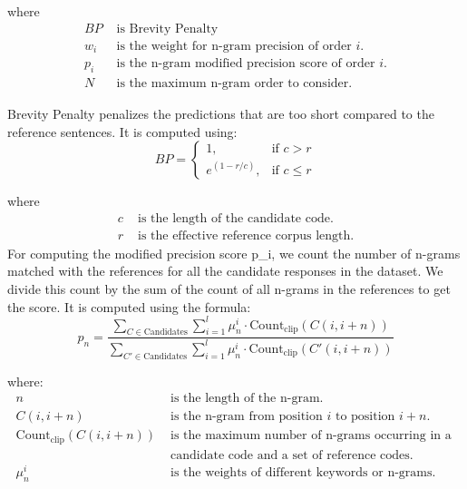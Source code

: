where
\begin{align*}
BP &\text{ is Brevity Penalty} \\
w_i &\text{ is the weight for n-gram precision of order } i. \\
p_i &\text{ is the n-gram modified precision score of order } i. \\
N &\text{ is the maximum n-gram order to consider.}
\end{align*}

Brevity Penalty penalizes the predictions that are too short compared to the reference sentences. It is computed using:
\begin{equation}
BP = 
\begin{cases}
1, & \text{if } c > r \\
e^{(1 - r/c)}, & \text{if } c \leq r
\end{cases}
\end{equation}

where
\begin{align*}
c &\text{ is the length of the candidate code.} \\
r &\text{ is the effective reference corpus length.}
\end{align*}
For computing the modified precision score p\_i, we count the number of n-grams matched with the references for all the candidate responses in the dataset. We divide this count by the sum of the count of all n-grams in the references to get the score. It is computed using the formula:
\begin{equation}
p_n = \frac{\sum_{C \in \text{Candidates}} \sum_{i=1}^{l} \mu_n^i \cdot \text{Count}_{\text{clip}} (C(i,i+n))}{\sum_{C' \in \text{Candidates}} \sum_{i=1}^{l} \mu_n^i \cdot \text{Count}_{\text{clip}} (C'(i,i+n))}
\end{equation}

where:
\begin{align*}
n &\text{ is the length of the n-gram.} \\
C(i, i+n) &\text{ is the n-gram from position } i \text{ to position } i+n. \\
\text{Count}_{\text{clip}}(C(i, i+n)) &\text{ is the maximum number of n-grams occurring in a } \\
&\text{ candidate code and a set of reference codes.} \\
\mu_n^i &\text{ is the weights of different keywords or n-grams.}
\end{align*}



